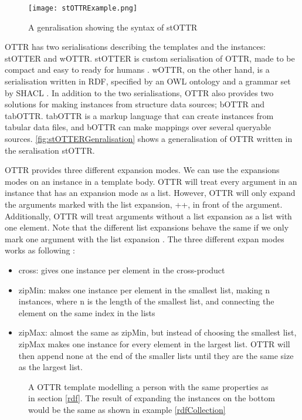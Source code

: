 \begin{figure}
    \centering
    \texttt{[image: stOTTRExample.png]}
    \caption{A genralisation showing the syntax of stOTTR}
    \label{fig:stOTTERGenralisation}
\end{figure}

\para
OTTR has two serialisations describing the templates and the instances: stOTTER and wOTTR. stOTTER is custom serialisation of OTTR, made to be compact and easy to ready for humans \autocite[4]{SLKK_OTTR_2021}. wOTTR, on the other hand, is a serialisation written in RDF, specified by an OWL ontology and a grammar set by SHACL \autocite{SHACL} \autocite[4]{SLKK_OTTR_2021}. In addition to the two serialisations, OTTR also provides two solutions for making instances from structure data sources; bOTTR and tabOTTR. tabOTTR is a markup language that can create instances from tabular data files, and bOTTR can make mappings over several queryable sources\autocite[16]{SLKK_OTTR_2021}. \autoref{fig:stOTTERGenralisation} shows a generalisation of OTTR written in the seralisation stOTTR.

\para
OTTR provides three different expansion modes. We can use the expansions modes on an instance in a template body. OTTR will treat every argument in an instance that has an expansion mode as a list. However, OTTR will only expand the arguments marked with the list expansion, ++, in front of the argument. Additionally, OTTR will treat arguments without a list expansion as a list with one element. Note that the different list expansions behave the same if we only mark one argument with the list expansion \autocite[480]{SLKF_OTTR_2018}. The three different expan modes works as following \autocite[8]{SLKK_OTTR_2021}:
\begin{itemize}
    \item cross: gives one instance per element in the cross-product
    \item zipMin: makes one instance per element in the smallest list, making n instances, where n is the length of the smallest list, and connecting the element on the same index in the lists
    \item zipMax: almost the same as zipMin, but instead of choosing the smallest list, zipMax makes one instance for every element in the largest list. OTTR will then append none at the end of the smaller lists until they are the same size as the largest list. 
\end{itemize}

\begin{figure}
    \begin{example}
        A OTTR template modelling a person with the same properties as in section \ref{rdf}. The result of expanding the instances on the bottom would be the same as shown in example \ref{rdfCollection}
    \end{example}
    
\end{figure}


